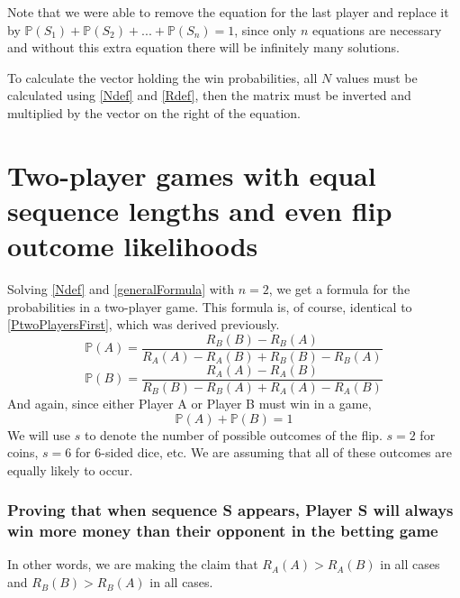 \documentclass[english,12pt,a4paper,final]{article}
\begin{document}
Note that we were able to remove the equation for the last player and replace it by $\mathbb{P}(S_1) + \mathbb{P}(S_2) + ... + \mathbb{P}(S_n) = 1$, since only $n$ equations are necessary and without this extra equation there will be infinitely many solutions.

To calculate the vector holding the win probabilities, all $N$ values must be calculated using \eqref{Ndef} and \eqref{Rdef}, then the matrix must be inverted and multiplied by the vector on the right of the equation.

\part{Two-player games with equal sequence lengths and even flip outcome likelihoods}\label{twoPlayerProofs}

Solving \eqref{Ndef} and \eqref{generalFormula} with $n=2$, we get a formula for the probabilities in a two-player game. This formula is, of course, identical to \eqref{PtwoPlayersFirst}, which was derived previously.
\begin{equation}\label{2playerAProb}
	\mathbb{P}(A)=\frac{R_B(B)-R_B(A)}{R_A(A)-R_A(B)+R_B(B)-R_B(A)}
\end{equation}
\begin{equation}\label{2playerBProb}
	\mathbb{P}(B)=\frac{R_A(A)-R_A(B)}{R_B(B)-R_B(A)+R_A(A)-R_A(B)}
\end{equation}
And again, since either Player A or Player B must win in a game,
\begin{equation*}
	\mathbb{P}(A)+\mathbb{P}(B)=1
\end{equation*}
We will use $s$ to denote the number of possible outcomes of the flip. $s=2$ for coins, $s=6$ for 6-sided dice, etc. We are assuming that all of these outcomes are equally likely to occur.

\section{Proving that when sequence S appears, Player S will always win more money than their opponent in the betting game}

In other words, we are making the claim that $R_A(A)>R_A(B)$ in all cases and $R_B(B)>R_B(A)$ in all cases.
\end{document}
